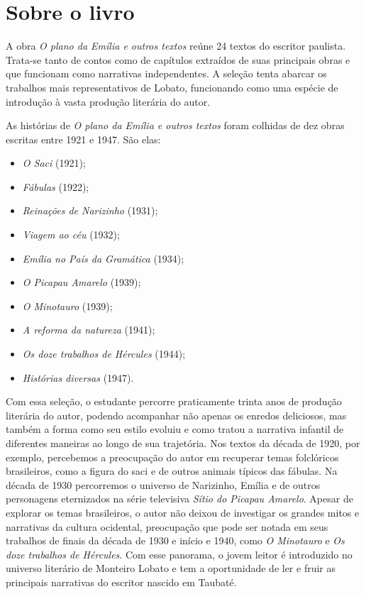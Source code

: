\documentclass[11pt]{extarticle}
\begin{document}
\section{Sobre o livro}
A obra \textit{O plano da Emília e outros textos} reúne 24 textos do escritor paulista.
Trata-se tanto de contos como de capítulos extraídos de suas principais obras e que funcionam como narrativas independentes. A seleção tenta abarcar os trabalhos mais representativos de Lobato, funcionando como uma espécie de introdução à vasta produção literária do autor.

As histórias de \textit{O plano da Emília e outros textos} foram colhidas de dez obras escritas entre 1921 e 1947. São elas:

\begin{itemize}
\item\textit{O Saci} (1921);
\item\textit{Fábulas} (1922);
\item\textit{Reinações de Narizinho} (1931);
\item\textit{Viagem ao céu} (1932);
\item\textit{Emília no País da Gramática} (1934);
\item\textit{O Picapau Amarelo} (1939);
\item\textit{O Minotauro} (1939);
\item\textit{A reforma da natureza} (1941);
\item\textit{Os doze trabalhos de Hércules} (1944);
\item\textit{Histórias diversas} (1947).
\end{itemize}

Com essa seleção, o estudante percorre praticamente trinta anos de produção literária do autor, podendo acompanhar não apenas os enredos deliciosos, mas também a forma como seu estilo evoluiu e como tratou a narrativa infantil de diferentes maneiras ao longo de sua trajetória. Nos textos da década de 1920, por exemplo, percebemos a preocupação do autor em recuperar temas folclóricos brasileiros, como a figura do saci e de outros animais típicos das fábulas. Na década de 1930 percorremos o universo de Narizinho, Emília e de outros personagens eternizados na série televisiva \textit{Sítio do Picapau Amarelo}.
Apesar de explorar os temas brasileiros, o autor não deixou de investigar os grandes mitos e narrativas da cultura ocidental, preocupação que pode ser notada em seus trabalhos de finais da década de 1930 e início e 1940, como \textit{O Minotauro} e \textit{Os doze trabalhos de Hércules}. Com esse panorama, o jovem leitor é introduzido no universo literário de Monteiro Lobato e tem a oportunidade de ler e fruir as principais narrativas do escritor nascido em Taubaté.
\end{document}
